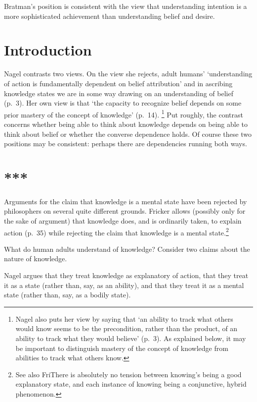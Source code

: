 \documentclass[11pt,a4paper]{extarticle}
\begin{document}
Bratman's position is consistent with the view that understanding intention is a more sophisticated achievement than understanding belief and desire.




\section{Introduction}
Nagel contrasts two views.
On the view she rejects, adult humans' `understanding of action is fundamentally dependent on belief attribution' and in ascribing knowledge states we are in some way drawing on an understanding of belief (p.\ 3).
Her own view is that `the capacity to recognize belief depends on some prior mastery of the concept of knowledge' (p.\ 14).%
\footnote{
Nagel also puts her view by saying that `an ability to track what others would know seems to be the precondition, rather than the product, of an ability to track what they would believe' (p.\ 3).
As explained below, it may be important to distinguish mastery of the concept of knowledge from abilities to track what others know.
}
Put roughly, the contrast concerns whether being able to think about knowledge depends on being able to think about belief or whether the converse dependence holds.
Of course these two positions may be consistent: perhaps there are dependencies running both ways.  





\section{***}
Arguments for the claim that knowledge is a mental state have been rejected by philosophers on several quite different grounds.
Fricker allows (possibly only for the sake of argument) that knowledge does, and is ordinarily taken, to explain action (p.\ 35) while rejecting the claim that knowledge is a mental state.\footnote{
See also FriThere is absolutely no tension between knowing's being a good explanatory state, and each instance of knowing being a conjunctive, hybrid phenomenon. 
}
%

What do human adults understand of knowledge?
Consider two claims about the nature of knowledge.



Nagel argues that they treat knowledge as explanatory of action, that they treat it as a state (rather than, say, as an ability), and that they treat it as a mental state (rather than, say, as a bodily state).
 
\end{document}
